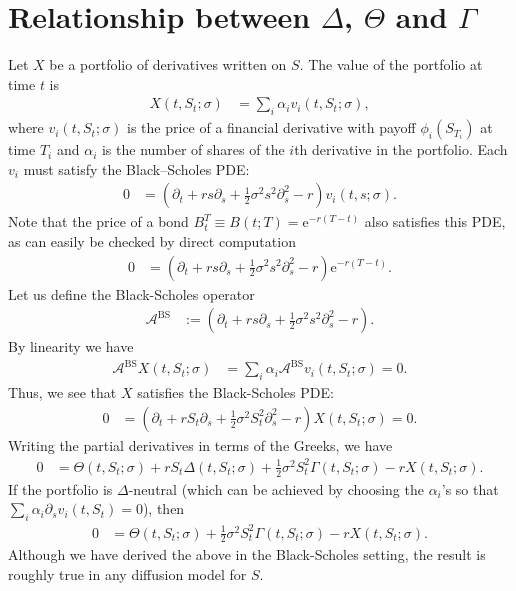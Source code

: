 \documentclass[12pt]{book}
\numberwithin{equation}{chapter}
\theoremstyle{plain}
\numberwithin{theorem}{section}
\theoremstyle{definition}
\numberwithin{exercise}{chapter}
\newcommand{\<}{\langle}
\renewcommand{\>}{\rangle}
\renewcommand{\(}{\left(}
\renewcommand{\)}{\right)}
\renewcommand{\[}{\left[}
\renewcommand{\]}{\right]}
\newcommand\Ac{\mathscr{A}}
\newcommand\sig{\sigma}
\newcommand\Gam{\Gamma}
\renewcommand\d{\partial}
\newcommand\ee{\mathrm{e}}
\newcommand\BS{\textrm{BS}}
\theoremstyle{definition}
\numberwithin{question}{section}
\begin{document}
\section{Relationship between $\Delta$, $\Theta$ and $\Gamma$}
Let $X$ be a portfolio of derivatives written on $S$.  The value of the portfolio at time $t$ is
\begin{align}
X(t,S_t;\sig) 
		&= \sum_i \alpha_i v_i (t, S_t;\sig),
\end{align}
where $v_i(t,S_t;\sig)$ is the price of a financial derivative with payoff $\phi_i(S_{T_i})$ at time $T_i$ and $\alpha_i$ is the number of shares of the $i$th derivative in the portfolio. Each $v_i$ must satisfy the Black--Scholes PDE:
\begin{align} \label{eq:7}
0
		&= \(\d_t + r s \d_s + \frac{1}{2} \sigma^2 s^2 \d_s^2 - r\) v_i(t,s;\sig) .
\end{align}
Note that the price of a bond $B_t^T \equiv B(t;T) = \ee^{-r(T-t)}$ also satisfies this PDE, as can easily be checked by direct computation
\begin{align}
0
	&=	\(\d_t + r s \d_s + \frac{1}{2} \sigma^2 s^2 \d_s^2 - r\) \ee^{-r(T-t)} .
\end{align}
Let us define the Black-Scholes operator
\begin{align}
\Ac^\BS 
&:= \( \d_t + r s \d_s + \frac{1}{2} \sigma^2 s^2 \d_s^2 - r \) .
\end{align}
By linearity we have
\begin{align}
\Ac^\BS X(t,S_t;\sig) 
	&= \sum_i \alpha_i \Ac^\BS v_i (t, S_t;\sig) = 0 .
\end{align}
Thus, we see that $X$ satisfies the Black-Scholes PDE:
\begin{align}
0
	&=	\( \d_t + r S_t \d_s + \frac{1}{2} \sigma^2 S_t^2 \d_s^2 - r \) X(t,S_t;\sig) = 0 .
\end{align}
Writing the partial derivatives in terms of the Greeks, we have
\begin{align}
0
		&=	\Theta(t,S_t;\sig) + r S_t \Delta(t,S_t;\sig) + \frac{1}{2} \sigma^2 S_t^2 \Gam(t,S_t;\sig) - r X(t,S_t;\sig) .
\end{align}
If the portfolio is $\Delta$-neutral (which can be achieved by choosing the $\alpha_i$'s so that $\sum_i \alpha_i \d_s v_i(t,S_t) = 0$), then
\begin{align}
0
		&=	\Theta(t,S_t;\sig) + \frac{1}{2} \sigma^2 S_t^2 \Gam(t,S_t;\sig) - r X(t,S_t;\sig)  .
\end{align}
Although we have derived the above in the Black-Scholes setting, the result is roughly true in any diffusion model for $S$.
\end{document}
